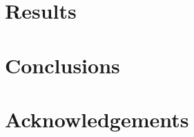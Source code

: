 \documentclass[11pt,letter,twoside]{mc2011}
\begin{document}
\section{Results}

\section{Conclusions}


\section*{Acknowledgements}




\end{document}
